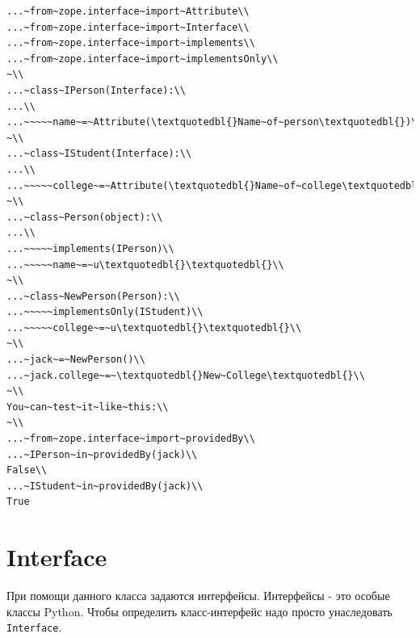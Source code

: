 \documentclass[a4paper,openany,twoside,draft]{book}
\begin{document}
\begin{verbatim}
...~from~zope.interface~import~Attribute\\
...~from~zope.interface~import~Interface\\
...~from~zope.interface~import~implements\\
...~from~zope.interface~import~implementsOnly\\
~\\
...~class~IPerson(Interface):\\
...\\
...~~~~~name~=~Attribute(\textquotedbl{}Name~of~person\textquotedbl{})\\
~\\
...~class~IStudent(Interface):\\
...\\
...~~~~~college~=~Attribute(\textquotedbl{}Name~of~college\textquotedbl{})\\
~\\
...~class~Person(object):\\
...\\
...~~~~~implements(IPerson)\\
...~~~~~name~=~u\textquotedbl{}\textquotedbl{}\\
~\\
...~class~NewPerson(Person):\\
...~~~~~implementsOnly(IStudent)\\
...~~~~~college~=~u\textquotedbl{}\textquotedbl{}\\
~\\
...~jack~=~NewPerson()\\
...~jack.college~=~\textquotedbl{}New~College\textquotedbl{}\\
~\\
You~can~test~it~like~this:\\
~\\
...~from~zope.interface~import~providedBy\\
...~IPerson~in~providedBy(jack)\\
False\\
...~IStudent~in~providedBy(jack)\\
True
\end{verbatim}


\section*{Interface%
  \label{interface}%
}

При помощи данного класса задаются интерфейсы. Интерфейсы - это особые
классы Python.  Чтобы определить класс-интерфейс надо просто
унаследовать \texttt{Interface}.
\end{document}
